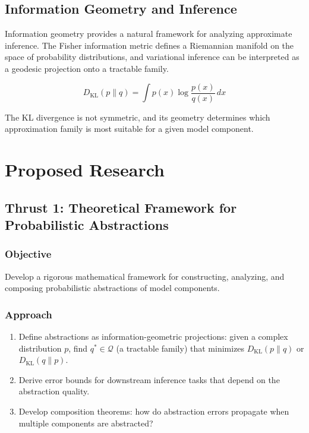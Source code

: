\documentclass[
    language=english,
    doctype=dissertation-proposal,
    institution=none,
]{../../omnilatex}
\begin{document}
\subsection{Information Geometry and Inference}

Information geometry \cite{amari2016information} provides a natural
framework for analyzing approximate inference. The Fisher information
metric defines a Riemannian manifold on the space of probability
distributions, and variational inference can be interpreted as a
geodesic projection onto a tractable family.

\begin{equation}
    D_{\text{KL}}(p \| q) = \int p(x) \log \frac{p(x)}{q(x)} \, dx
    \label{eq:kl}
\end{equation}

The KL divergence is not symmetric, and its geometry determines which
approximation family is most suitable for a given model component.

\section{Proposed Research}
\label{sec:proposed}

\subsection{Thrust 1: Theoretical Framework for Probabilistic Abstractions}

\subsubsection{Objective}
Develop a rigorous mathematical framework for constructing, analyzing, and
composing probabilistic abstractions of model components.

\subsubsection{Approach}
\begin{enumerate}
    \item Define abstractions as information-geometric projections: given a
          complex distribution $p$, find $q^* \in \mathcal{Q}$ (a tractable
          family) that minimizes $D_{\text{KL}}(p \| q)$ or $D_{\text{KL}}(q \| p)$.
    \item Derive error bounds for downstream inference tasks that depend on
          the abstraction quality.
    \item Develop composition theorems: how do abstraction errors propagate
          when multiple components are abstracted?
\end{enumerate}
\end{document}
